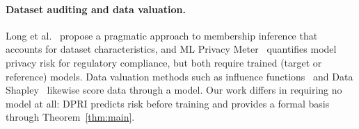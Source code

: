 \paragraph{Dataset auditing and data valuation.}
Long et al.~\cite{long2020pragmatic} propose a pragmatic approach to
membership inference that accounts for dataset characteristics, and ML
Privacy Meter~\cite{murakonda2020ml} quantifies model privacy risk for
regulatory compliance, but both require trained (target or reference)
models. Data valuation methods such as influence
functions~\cite{koh2017understanding} and Data
Shapley~\cite{ghorbani2019data} likewise score data through a model.
Our work differs in requiring no model at all: DPRI predicts risk before
training and provides a formal basis through Theorem~\ref{thm:main}.

